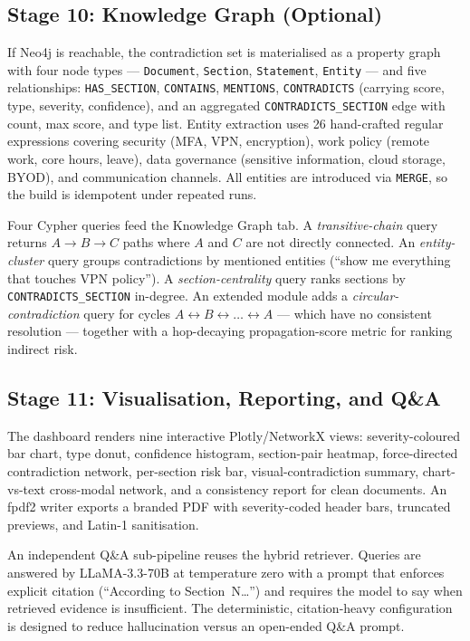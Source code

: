 \documentclass[conference]{IEEEtran}
\begin{document}
\subsection{Stage 10: Knowledge Graph (Optional)}
If Neo4j is reachable, the contradiction set is materialised as a property graph with four node types --- \texttt{Document}, \texttt{Section}, \texttt{Statement}, \texttt{Entity} --- and five relationships: \texttt{HAS\_SECTION}, \texttt{CONTAINS}, \texttt{MENTIONS}, \texttt{CONTRADICTS} (carrying score, type, severity, confidence), and an aggregated \texttt{CONTRADICTS\_SECTION} edge with count, max score, and type list. Entity extraction uses 26 hand-crafted regular expressions covering security (MFA, VPN, encryption), work policy (remote work, core hours, leave), data governance (sensitive information, cloud storage, BYOD), and communication channels. All entities are introduced via \texttt{MERGE}, so the build is idempotent under repeated runs.

Four Cypher queries feed the Knowledge Graph tab. A \emph{transitive-chain} query returns $A \rightarrow B \rightarrow C$ paths where $A$ and $C$ are not directly connected. An \emph{entity-cluster} query groups contradictions by mentioned entities (``show me everything that touches VPN policy''). A \emph{section-centrality} query ranks sections by \texttt{CONTRADICTS\_SECTION} in-degree. An extended module adds a \emph{circular-contradiction} query for cycles $A \leftrightarrow B \leftrightarrow \ldots \leftrightarrow A$ --- which have no consistent resolution --- together with a hop-decaying propagation-score metric for ranking indirect risk.

\subsection{Stage 11: Visualisation, Reporting, and Q\&A}
The dashboard renders nine interactive Plotly/NetworkX views: severity-coloured bar chart, type donut, confidence histogram, section-pair heatmap, force-directed contradiction network, per-section risk bar, visual-contradiction summary, chart-vs-text cross-modal network, and a consistency report for clean documents. An fpdf2 writer exports a branded PDF with severity-coded header bars, truncated previews, and Latin-1 sanitisation.

An independent Q\&A sub-pipeline reuses the hybrid retriever. Queries are answered by LLaMA-3.3-70B at temperature zero with a prompt that enforces explicit citation (``According to Section~N\ldots'') and requires the model to say when retrieved evidence is insufficient. The deterministic, citation-heavy configuration is designed to reduce hallucination versus an open-ended Q\&A prompt.
\end{document}
